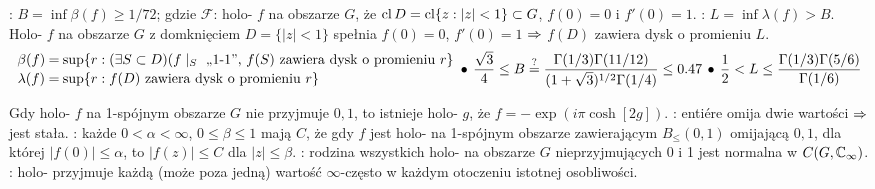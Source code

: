 :  $B = \inf \beta(f)  \ge 1/72$; gdzie $\mathcal F$: holo- $f$ na obszarze $G$, że $\operatorname{cl} D = \operatorname{cl} \{z : |z| < 1\} \subset G$, $f(0) = 0$ i $f'(0) = 1$.
: $L = \inf \lambda(f) > B$. 
Holo- $f$ na obszarze $G$ z domknięciem $D = \{|z| < 1\}$ spełnia $f(0) = 0$, $f'(0) = 1$ $\Rightarrow$ $f(D)$ zawiera dysk o promieniu $L$.
\[
	\color{white}\frac{\color{black}\beta(f)}{\color{black}\lambda(f)} \frac{\color{black} =}{\color{black} =} \frac{\color{black} \sup\{r : (\exists S \subset D)(f \mid_S \text{ ,,1-1'', }f(S) \text{ zawiera dysk o promieniu } r\}}{\color{black}\sup\{r : f(D) \text{ zawiera dysk o promieniu } r\}\hfill} \color{black} \spk 
	\frac{\sqrt{3}}{4} \le B \stackrel{?}{=} \frac{\Gamma(1/3)\Gamma(11/12)}{(1+\sqrt{3})^{1/2} \Gamma(1/4)} \le 0.47 \spk
	\frac 1 2 < L \le \frac{\Gamma(1/3)\Gamma(5/6)}{\Gamma(1/6)}
\]

Gdy holo-  $f$ na 1-spójnym obszarze $G$ nie przyjmuje $0, 1$, to istnieje holo- $g$, że $f = -\exp(i \pi \cosh [2g])$.
: entiére omija dwie wartości $\Rightarrow$ jest stała.
:  każde $0 < \alpha < \infty$, $0 \le \beta \le 1$ mają $C$, że gdy $f$ jest holo- na 1-spójnym obszarze zawierającym $B_\le(0,1)$ omijającą $0, 1$, dla której $|f(0)| \le \alpha$, to $|f(z)| \le C$ dla $|z| \le \beta$.
:  rodzina wszystkich holo- na obszarze $G$ nieprzyjmujących 0 i 1 jest normalna w $C(G, \mathbb{C}_\infty)$.
: holo- przyjmuje każdą (może poza jedną) wartość $\infty$-często w każdym otoczeniu istotnej osobliwości.
